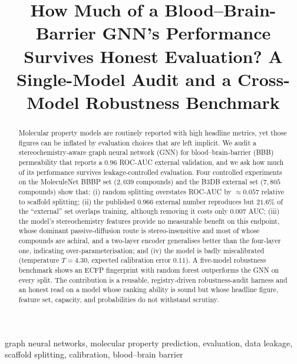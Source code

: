 \documentclass[conference]{IEEEtran}
\begin{document}
\title{How Much of a Blood--Brain-Barrier GNN's Performance Survives Honest
Evaluation? A Single-Model Audit and a Cross-Model Robustness Benchmark}

\author{
}

\maketitle

\begin{abstract}
Molecular property models are routinely reported with high headline metrics, yet
those figures can be inflated by evaluation choices that are left implicit. We
audit a stereochemistry-aware graph neural network (GNN) for blood--brain-barrier
(BBB) permeability that reports a $0.96$ ROC-AUC external validation, and we ask
how much of its performance survives leakage-controlled evaluation. Four
controlled experiments on the MoleculeNet BBBP set ($2{,}039$ compounds) and the
B3DB external set ($7{,}805$ compounds) show that: (i) random splitting overstates
ROC-AUC by $\approx 0.057$ relative to scaffold splitting; (ii) the published
$0.966$ external number reproduces but $21.6\%$ of the ``external'' set overlaps
training, although removing it costs only $0.007$ AUC; (iii) the model's
stereochemistry features provide no measurable benefit on this endpoint, whose
dominant passive-diffusion route is stereo-insensitive and most of whose compounds
are achiral, and a two-layer encoder generalises better than the four-layer one,
indicating over-parameterisation; and (iv) the model is badly miscalibrated
(temperature $T=4.30$, expected calibration error $0.11$). A five-model robustness
benchmark shows an ECFP fingerprint with random forest outperforms the GNN on
every split. The contribution is a reusable, registry-driven robustness-audit
harness and an honest read on a model whose ranking ability is sound but whose
headline figure, feature set, capacity, and probabilities do not withstand
scrutiny.
\end{abstract}

\begin{IEEEkeywords}
graph neural networks, molecular property prediction, evaluation, data leakage,
scaffold splitting, calibration, blood--brain barrier
\end{IEEEkeywords}
\end{document}
